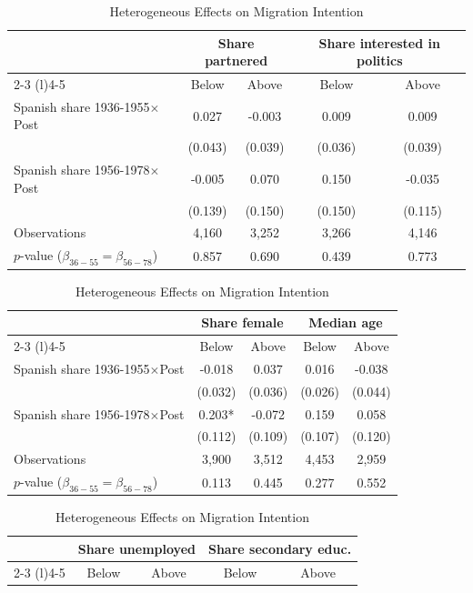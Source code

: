 \begin{table}[!h]
\centering
\renewcommand{\arraystretch}{0.95}
\setlength{\tabcolsep}{8pt}
\captionsetup{justification=centering}
\caption{Heterogeneous Effects on Migration Intention}
\begin{tabular*}{\textwidth}{l@{\extracolsep{\fill}}cccc}
\hline
& \multicolumn{2}{c}{Share partnered} & \multicolumn{2}{c}{Share interested in politics} \\
\cmidrule(l){2-3} \cmidrule(l){4-5}
& Below & Above & Below & Above \\
\hline
Spanish share 1936-1955$\times$Post & 0.027 & -0.003 & 0.009 & 0.009 \\
 & (0.043) & (0.039) & (0.036) & (0.039) \\
Spanish share 1956-1978$\times$Post & -0.005 & 0.070 & 0.150 & -0.035 \\
  & (0.139) & (0.150) & (0.150) & (0.115) \\
\addlinespace
Observations & 4,160 & 3,252 & 3,266 & 4,146 \\
$p$-value ($\beta_{36{-}55} = \beta_{56{-}78}$) & 0.857 & 0.690 & 0.439 & 0.773 \\
\hline
\end{tabular*}
\begin{tabular*}{\textwidth}{l@{\extracolsep{\fill}}cccc}
& \multicolumn{2}{c}{Share female} & \multicolumn{2}{c}{Median age} \\
\cmidrule(l){2-3} \cmidrule(l){4-5}
& Below & Above & Below & Above \\
\hline
Spanish share 1936-1955$\times$Post & -0.018 & 0.037 & 0.016 & -0.038 \\
 & (0.032) & (0.036) & (0.026) & (0.044) \\
Spanish share 1956-1978$\times$Post & 0.203* & -0.072 & 0.159 & 0.058 \\
  & (0.112) & (0.109) & (0.107) & (0.120) \\
\addlinespace
Observations & 3,900 & 3,512 & 4,453 & 2,959 \\
$p$-value ($\beta_{36{-}55} = \beta_{56{-}78}$) & 0.113 & 0.445 & 0.277 & 0.552 \\
\hline
\end{tabular*}
\begin{tabular*}{\textwidth}{l@{\extracolsep{\fill}}cccc}
& \multicolumn{2}{c}{Share unemployed} & \multicolumn{2}{c}{Share secondary educ.} \\
\cmidrule(l){2-3} \cmidrule(l){4-5}
& Below & Above & Below & Above \\

\end{tabular*}
\end{table}
